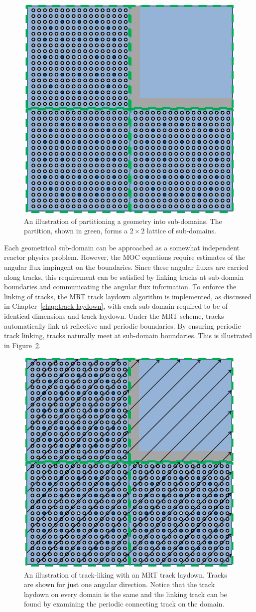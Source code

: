 \begin{figure}[h!]
	\centering
	\includegraphics[width=0.6\linewidth]{figures/DD/moc-dd-geometry.PNG}
	\caption[]{An illustration of partitioning a geometry into sub-domains. The partition, shown in green, forms a $2 \times 2$ lattice of sub-domains.}
	\label{fig:domain-partition}
\end{figure}

Each geometrical sub-domain can be approached as a somewhat independent reactor physics problem. However, the \ac{MOC} equations require estimates of the angular flux impingent on the boundaries. Since these angular fluxes are carried along tracks, this requirement can be satisfied by linking tracks at sub-domain boundaries and communicating the angular flux information. To enforce the linking of tracks, the \ac{MRT} track laydown algorithm is implemented, as discussed in Chapter~\ref{chap:track-laydown}, with each sub-domain required to be of identical dimensions and track laydown. Under the \ac{MRT} scheme, tracks automatically link at reflective and periodic boundaries. By ensuring periodic track linking, tracks naturally meet at sub-domain boundaries. This is illustrated in Figure~\ref{fig:domain-track-linking}.

\begin{figure}[h!]
	\centering
	\includegraphics[width=0.6\linewidth]{figures/DD/moc-dd-rays.PNG}
	\caption[]{An illustration of track-liking with an \ac{MRT} track laydown. Tracks are shown for just one angular direction. Notice that the track laydown on every domain is the same and the linking track can be found by examining the periodic connecting track on the domain.}
	\label{fig:domain-track-linking}
\end{figure}

